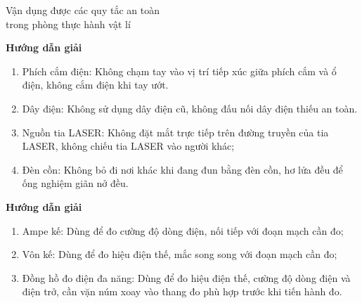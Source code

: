 \begin{dang}{Vận dụng được các quy tắc an toàn \\trong phòng thực hành vật lí}
	{	\begin{center}
			\textbf{Hướng dẫn giải}
		\end{center}
		
		\begin{enumerate}
			\item Phích cắm điện: Không chạm tay vào vị trí tiếp xúc giữa phích cắm và ổ điện, không cắm điện khi tay ướt.
			\item Dây điện: Không sử dụng dây điện cũ, không đấu nối dây điện thiếu an toàn.
			\item Nguồn tia LASER: Không đặt mắt trực tiếp trên đường truyền của tia LASER, không chiếu tia LASER vào người khác;
			\item Đèn cồn: Không bỏ đi nơi khác khi đang đun bằng đèn cồn, hơ lửa đều để ống nghiệm giãn nở đều.
		\end{enumerate}
	}
	{\begin{center}
			\textbf{Hướng dẫn giải}
		\end{center}
		
		\begin{enumerate}
			\item Ampe kế: Dùng để đo cường độ dòng điện, nối tiếp với đoạn mạch cần đo;
			\item Vôn kế: Dùng để đo hiệu điện thế, mắc song song với đoạn mạch cần đo;
			\item Đồng hồ đo điện đa năng: Dùng để đo hiệu điện thế, cường độ dòng điện và điện trở, cần vặn núm xoay vào thang đo phù hợp trước khi tiến hành đo.
		\end{enumerate}
	}
\end{dang}
